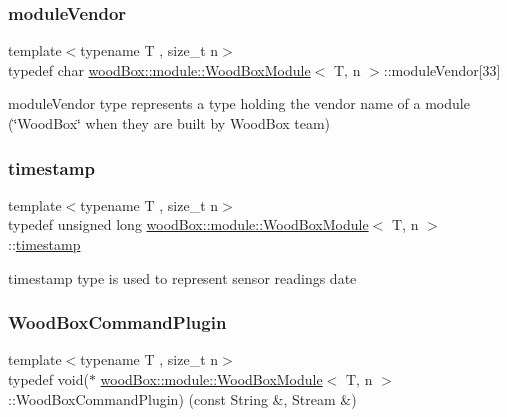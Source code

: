 \subsubsection{\texorpdfstring{module\+Vendor}{moduleVendor}}
{\footnotesize\ttfamily template$<$typename T , size\+\_\+t n$>$ \\
typedef char \mbox{\hyperlink{classwood_box_1_1module_1_1_wood_box_module}{wood\+Box\+::module\+::\+Wood\+Box\+Module}}$<$ T, n $>$\+::module\+Vendor\mbox{[}33\mbox{]}}

module\+Vendor type represents a type holding the vendor name of a module (\char`\"{}\+Wood\+Box\char`\"{} when they are built by Wood\+Box team) \mbox{\label{classwood_box_1_1module_1_1_wood_box_module_ab03bf835ec02656605c3c0df0188dc28}} 
\subsubsection{\texorpdfstring{timestamp}{timestamp}}
{\footnotesize\ttfamily template$<$typename T , size\+\_\+t n$>$ \\
typedef unsigned long \mbox{\hyperlink{classwood_box_1_1module_1_1_wood_box_module}{wood\+Box\+::module\+::\+Wood\+Box\+Module}}$<$ T, n $>$\+::\mbox{\hyperlink{classwood_box_1_1module_1_1_wood_box_module_ab03bf835ec02656605c3c0df0188dc28}{timestamp}}}

timestamp type is used to represent sensor readings date \mbox{\label{classwood_box_1_1module_1_1_wood_box_module_ab0e08bb82f5585fd357ce1881855d0e2}} 
\subsubsection{\texorpdfstring{Wood\+Box\+Command\+Plugin}{WoodBoxCommandPlugin}}
{\footnotesize\ttfamily template$<$typename T , size\+\_\+t n$>$ \\
typedef void($\ast$ \mbox{\hyperlink{classwood_box_1_1module_1_1_wood_box_module}{wood\+Box\+::module\+::\+Wood\+Box\+Module}}$<$ T, n $>$\+::Wood\+Box\+Command\+Plugin) (const String \&, Stream \&)}

